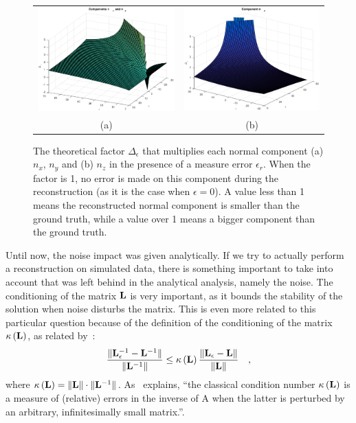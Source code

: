 \documentclass{report}
\begin{document}
\begin{figure}
  \centering
  \begin{tabular}{cc}
  \includegraphics[width=0.45\linewidth]{q3_analytic_nx_ny.pdf} &
  \includegraphics[width=0.45\linewidth]{q3_analytic_nz.pdf} \\
  (a) & (b)
  \end{tabular}
  \caption[Analytical normal component coefficients]
   {The theoretical factor $\Delta_\epsilon$ that multiplies each normal component (a) $n_x$, $n_y$ and (b) $n_z$ in the presence of a measure error $\epsilon_r$. When the factor is 1, no error is made on this component during the reconstruction (as it is the case when $\epsilon = 0$). A value less than 1 means the reconstructed normal component is smaller than the ground truth, while a value over 1 means a bigger component than the ground truth.}
  \label{q3:analytical}
\end{figure}

Until now, the noise impact was given analytically. If we try to actually perform a reconstruction on simulated data, there is something important to take into account that was left behind in the analytical analysis, namely the noise. The conditioning of the matrix $\mathbf{L}$ is very important, as it bounds the stability of the solution when noise disturbs the matrix. This is even more related to this particular question because of the definition of the conditioning of the matrix $\kappa \left(\mathbf{L}\right)$, as related by~\cite{ElGhaoui2002}:
\begin{equation}
\frac{ \| \mathbf{L}_\epsilon ^{-1} - \mathbf{L}^{-1} \| }{ \| \mathbf{L}^{-1} \| }
\le \kappa\left(\mathbf{L} \right) \frac{ \| \mathbf{L}_\epsilon - \mathbf{L}  \| }{ \| \mathbf{L} \| }
\quad,
\end{equation}
where $\kappa \left(\mathbf{L}\right) = \|\mathbf{L}\| \cdot \|\mathbf{L}^{-1}\|$. As~\cite{ElGhaoui2002} explains, ``the classical condition number $\kappa \left(\mathbf{L}\right)$ is a measure of (relative) errors in the inverse of A when the latter is perturbed by an arbitrary, infinitesimally small matrix.''.
\end{document}
